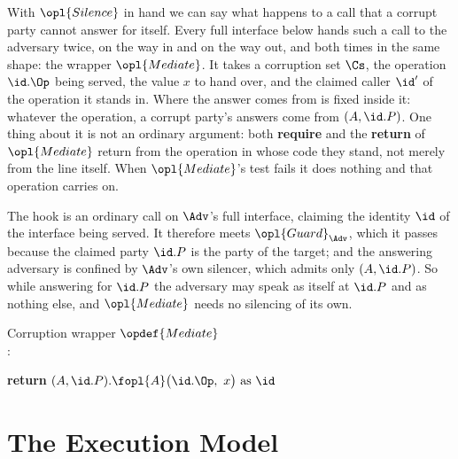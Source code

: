 \documentclass[10pt,oneside,openany]{book}
\theoremstyle{accentdef}
\theoremstyle{accentplain}
\begin{document}
With $\opl{Silence}$ in hand we can say what happens to a call that a corrupt party cannot answer
for itself. Every full interface below hands such a call to the adversary twice, on the way in
and on the way out, and both times in the same shape: the wrapper $\opl{Mediate}$. It takes a
corruption set $\Cs$, the operation $\id.\Op$ being served, the value $x$ to hand over, and the
claimed caller $\id'$ of the operation it stands in. Where the answer comes from is fixed inside
it: whatever the operation, a corrupt party's answers come from $(A,\id.P)$. One thing about it is
not an ordinary argument: both \textbf{require} and the \textbf{return} of $\opl{Mediate}$ return
from the operation in whose code they stand, not merely from the line itself. When $\opl{Mediate}$'s test
fails it does nothing and that operation carries on.

The hook is an ordinary call on $\Adv$'s full interface, claiming the identity $\id$ of the
interface being served. It therefore meets $\opl{Guard}_{\Adv}$, which it passes because the
claimed party $\id.P$ is the party of the target; and the answering adversary is confined by
$\Adv$'s own silencer, which admits only $(A,\id.P)$. So while answering for $\id.P$ the
adversary may speak as itself at $\id.P$ and as nothing else, and $\opl{Mediate}$ needs no
silencing of its own.

\begin{procedure}{Corruption wrapper $\opdef{Mediate}$ \\
}
:
\begin{algorithmic}[1]
  \State \textbf{return} $(A,\id.P).\fopl{A}\bigl(\id.\Op,\ x\bigr) \text{ as } \id$
\EndIf
\end{algorithmic}
\end{procedure}

\chapter{The Execution Model}\label{ch:execmodel}

\end{document}
